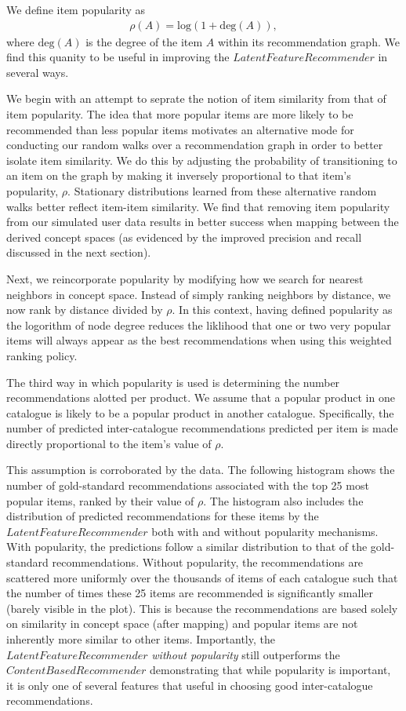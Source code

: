 \documentclass[11pt]{article}
\begin{document}
We define item popularity as
\begin{align}
\rho(A) = \mathrm{log}(1 + \mathrm{deg}(A)),
\end{align}
where $\mathrm{deg}(A)$ is the degree of the item $A$ within its recommendation
graph.  We find this quanity to be useful in improving the
$LatentFeatureRecommender$ in several ways.

We begin with an attempt to seprate the notion of item similarity from that of
item popularity. The idea that more popular items are more likely to be
recommended than less popular items motivates an alternative mode for conducting
our random walks over a recommendation graph in order to better isolate item
similarity. We do this by adjusting the probability of transitioning to an item
on the graph by making it inversely proportional to that item's popularity,
$\rho$. Stationary distributions learned from these alternative random walks
better reflect item-item similarity. We find that removing item popularity from
our simulated user data results in better success when mapping between the
derived concept spaces (as evidenced by the improved precision and recall
discussed in the next section).

Next, we reincorporate popularity by modifying how we search for nearest
neighbors in concept space. Instead of simply ranking neighbors by distance, we
now rank by distance divided by $\rho$.  In this context, having defined
popularity as the logorithm of node degree reduces the liklihood that one or two
very popular items will always appear as the best recommendations when using
this weighted ranking policy. 

The third way in which popularity is used is determining the number
recommendations alotted per product. We assume that a popular product in one
catalogue is likely to be a popular product in another catalogue. Specifically,
the number of predicted inter-catalogue recommendations predicted per item is
made directly proportional to the item's value of $\rho$.

This assumption is corroborated by the data. The following histogram shows the
number of gold-standard recommendations associated with the top 25 most popular
items, ranked by their value of $\rho$. The histogram also includes the
distribution of predicted recommendations for these items by the
$LatentFeatureRecommender$ both with and without popularity mechanisms. With
popularity, the predictions follow a similar distribution to that of the
gold-standard recommendations. Without popularity, the recommendations are
scattered more uniformly over the thousands of items of each catalogue such that
the number of times these 25 items are recommended is significantly smaller
(barely visible in the plot). This is because the recommendations are based
solely on similarity in concept space (after mapping) and popular items are not
inherently more similar to other items. Importantly, the
$LatentFeatureRecommender$ {\em without popularity} still outperforms the
$ContentBasedRecommender$ demonstrating that while popularity is important, it
is only one of several features that useful in choosing good inter-catalogue
recommendations.
\end{document}
